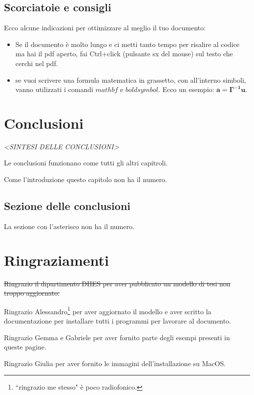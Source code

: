 \documentclass[envcountsame,envcountchap]{svmono}
\begin{document}
\section{Scorciatoie e consigli}

Ecco alcune indicazioni per ottimizzare al meglio il tuo documento:

\begin{itemize}
    \item Se il documento è molto lungo e ci metti tanto tempo
    per risalire al codice ma hai il pdf aperto, 
    fai Ctrl+click (pulsante sx del mouse) sul testo che cerchi nel pdf.
    \item se vuoi scrivere una formula matematica in grassetto, con all'interno simboli, vanno utilizzati
    i comandi $mathbf$ e $boldsymbol$. Ecco un esempio: $\mathbf{a=\boldsymbol{\Gamma}^{-1}u}$.

\end{itemize}

    


\chapter*{Conclusioni}

\vspace{2cm}

\begin{flushright}
 \textit{<SINTESI DELLE CONCLUSIONI>}
\end{flushright}

\vspace{0.5cm}

Le conclusioni funzionano come tutti gli altri capitroli.

Come l'introduzione questo capitolo non ha il numero.

\section*{Sezione delle conclusioni}
La sezione con l'asterisco non ha il numero.

\chapter*{Ringraziamenti}

\sout{Ringrazio il dipartimento DIIES per aver pubblicato un modello di tesi non troppo aggiornato.}

Ringrazio Alessandro\footnote{``ringrazio me stesso" è poco radiofonico.}
per aver aggiornato il modello e aver scritto la documentazione
per installare tutti i programmi per lavorare al documento.

Ringrazio Gemma e Gabriele per aver fornito parte degli esempi presenti in queste pagine.

Ringrazio Giulia per aver fornito le immagini dell'installazione su MacOS.






\end{document}
